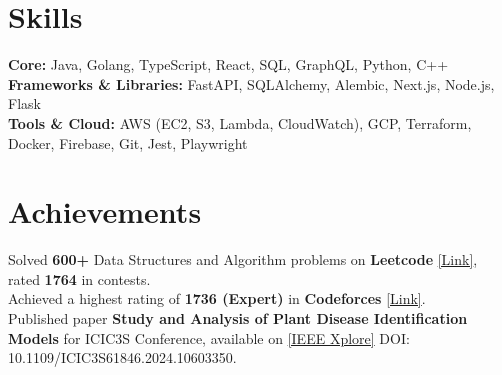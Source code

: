 \documentclass[]{Nikhil_Kadiyan_Resume}
\begin{document}

\section{Skills} 
\hrulefill


\pt \textbf{Core:} Java, Golang, TypeScript, React, SQL, GraphQL, Python, C++ \\
\pt \textbf{Frameworks \& Libraries:} FastAPI, SQLAlchemy, Alembic, Next.js, Node.js, Flask \\
\pt \textbf{Tools \& Cloud:} AWS (EC2, S3, Lambda, CloudWatch), GCP, Terraform, Docker, Firebase, Git, Jest, Playwright \\

\sectionsep

\section{Achievements} 
\hrulefill

\pt Solved \textbf{600+} Data Structures and Algorithm problems on \textbf{Leetcode} \href{https://leetcode.com/thisidusedbysomeone/}{[Link]}, rated \textbf{1764} in contests.\\ 
\pt Achieved a highest rating of \textbf{1736 (Expert)} in \textbf{Codeforces} \href{https://codeforces.com/profile/akatsumanoka}{[Link]}.\\
\pt Published paper \textbf{Study and Analysis of Plant Disease Identification Models} for ICIC3S Conference, available on \href{https://ieeexplore.ieee.org/document/10603350}{[IEEE Xplore]} DOI: 10.1109/ICIC3S61846.2024.10603350.\\
\end{document}
